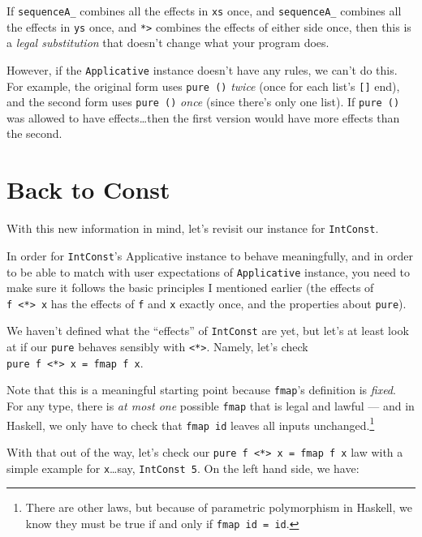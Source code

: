 \documentclass[]{article}
\begin{document}
If \texttt{sequenceA\_} combines all the effects in \texttt{xs} once, and
\texttt{sequenceA\_} combines all the effects in \texttt{ys} once, and
\texttt{*\textgreater{}} combines the effects of either side once, then this is
a \emph{legal substitution} that doesn't change what your program does.

However, if the \texttt{Applicative} instance doesn't have any rules, we can't
do this. For example, the original form uses \texttt{pure\ ()} \emph{twice}
(once for each list's \texttt{{[}{]}} end), and the second form uses
\texttt{pure\ ()} \emph{once} (since there's only one list). If
\texttt{pure\ ()} was allowed to have effects\ldots then the first version would
have more effects than the second.

\section{Back to Const}\label{back-to-const}

With this new information in mind, let's revisit our instance for
\texttt{IntConst}.

In order for \texttt{IntConst}'s Applicative instance to behave meaningfully,
and in order to be able to match with user expectations of \texttt{Applicative}
instance, you need to make sure it follows the basic principles I mentioned
earlier (the effects of \texttt{f\ \textless{}*\textgreater{}\ x} has the
effects of \texttt{f} and \texttt{x} exactly once, and the properties about
\texttt{pure}).

We haven't defined what the ``effects'' of \texttt{IntConst} are yet, but let's
at least look at if our \texttt{pure} behaves sensibly with
\texttt{\textless{}*\textgreater{}}. Namely, let's check
\texttt{pure\ f\ \textless{}*\textgreater{}\ x\ =\ fmap\ f\ x}.

Note that this is a meaningful starting point because \texttt{fmap}'s definition
is \emph{fixed}. For any type, there is \emph{at most one} possible
\texttt{fmap} that is legal and lawful --- and in Haskell, we only have to check
that \texttt{fmap\ id} leaves all inputs unchanged.\footnote{There are other
  laws, but because of parametric polymorphism in Haskell, we know they must be
  true if and only if \texttt{fmap\ id\ =\ id}.}

With that out of the way, let's check our
\texttt{pure\ f\ \textless{}*\textgreater{}\ x\ =\ fmap\ f\ x} law with a simple
example for \texttt{x}\ldots say, \texttt{IntConst\ 5}. On the left hand side,
we have:
\end{document}
